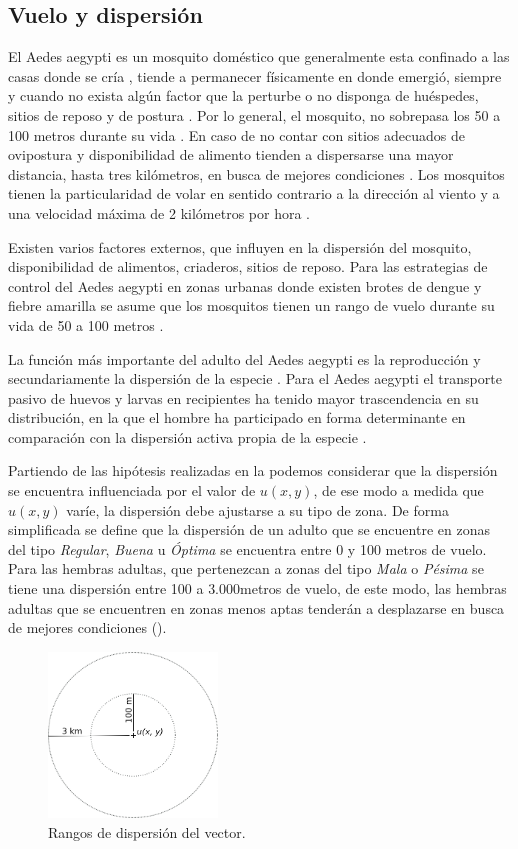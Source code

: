 
\subsection{Vuelo y dispersión}
\label{subsec:cap4-vuelo-dispersion}
El Aedes aegypti es un mosquito doméstico que generalmente esta confinado a las casas donde se
cría \cite{luevano1993ciclo}, tiende a permanecer físicamente en donde emergió, siempre y cuando
no exista algún factor que la perturbe o no disponga de huéspedes, sitios de reposo y de postura
\cite{ThironIzcazaJ2003}. Por lo general, el mosquito, no sobrepasa los 50 a 100 metros durante su
vida \cite{cabezas2005dengue}. En caso de no contar con sitios adecuados de ovipostura y
disponibilidad de alimento tienden a dispersarse una mayor distancia, hasta tres kilómetros, en
busca de mejores condiciones \cite{ThironIzcazaJ2003}. Los mosquitos tienen la particularidad de
volar en sentido contrario a la dirección al viento \cite{ThironIzcazaJ2003,web-site:speedAnimals}
y a una velocidad máxima de 2 kilómetros por hora \cite{web-site:speedAnimals,kaufmann2004flight}.

Existen varios factores externos, que influyen en la dispersión del mosquito, disponibilidad de
alimentos, criaderos, sitios de reposo. Para las estrategias de control del Aedes aegypti en zonas
urbanas donde existen brotes de dengue y fiebre amarilla se asume que los mosquitos tienen un
rango de vuelo durante su vida de 50 a 100 metros \cite{dengueUruguayCap8}.

La función más importante del adulto del Aedes aegypti es la reproducción y secundariamente la
dispersión de la especie \cite{ThironIzcazaJ2003}. Para el Aedes aegypti el transporte pasivo de
huevos y larvas en recipientes ha tenido mayor trascendencia en su distribución, en la que el
hombre ha participado en forma determinante en comparación con la dispersión activa propia de la
especie \citep{ThironIzcazaJ2003}.

Partiendo de las hipótesis realizadas en la  podemos considerar
que la dispersión se encuentra influenciada por el valor de $u(x,y)$, de ese modo a medida que
$u(x,y)$ varíe, la dispersión debe ajustarse a su tipo de zona. De forma simplificada se define que
la dispersión de un adulto que se encuentre en zonas del tipo \textit{Regular}, \textit{Buena} u
\textit{Óptima} se encuentra entre 0 y 100 metros de vuelo. Para las hembras adultas, que
pertenezcan a zonas del tipo \textit{Mala} o \textit{Pésima} se tiene una dispersión entre 100 a
$3.000 $metros de vuelo, de este modo, las hembras adultas que se encuentren en zonas menos aptas
tenderán a desplazarse en busca de mejores condiciones ().

\begin{figure}[!hptb]
\centering
\includegraphics[width=0.4\textwidth]{capitulo-4/graphics/rango-vuelo.png}
\caption{\label{fig:cap4-dispersion} Rangos de dispersión del vector.}
\end{figure}
